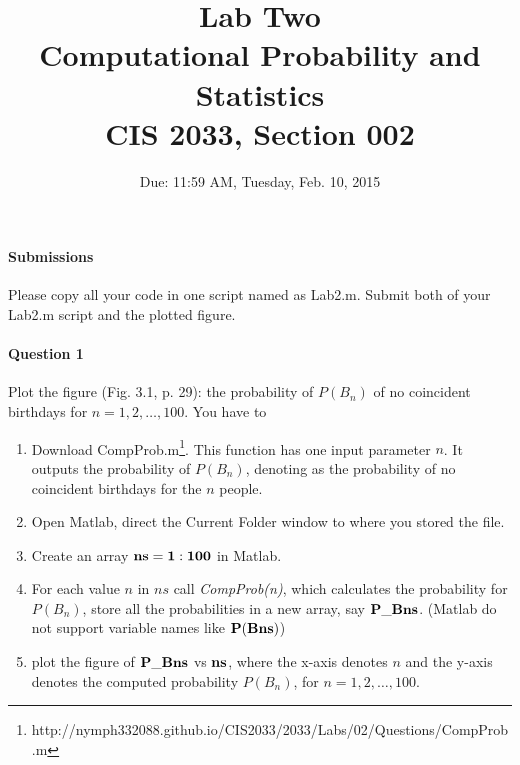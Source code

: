 \documentclass[11pt]{article} %
\title{Lab Two\\
Computational Probability and Statistics \\
CIS 2033, Section 002}
\author{Due: 11:59 AM, Tuesday, Feb. 10, 2015}
\date{} %
\begin{document}
\maketitle

\paragraph*{\bf Submissions} Please copy all your code in one script named as Lab2.m. Submit both of your Lab2.m script and the plotted figure. 

\paragraph*{Question 1}
Plot the figure (Fig. 3.1, p. 29): the probability of $P(B_n)$ of no coincident birthdays for $n=1, 2, \ldots, 100$. You have to 
\begin{enumerate}
\item Download CompProb.m\footnote{http://nymph332088.github.io/CIS2033/2033/Labs/02/Questions/CompProb.m}. This function has one input parameter $n$. It outputs the probability of $P(B_n)$, denoting as the probability of no coincident birthdays for the $n$ people.
\item Open Matlab, direct the Current Folder window to where you stored the file. 
\item Create an array $\bf ns = 1:100$ in Matlab.
\item For each value $n$ in $ns$ call {\it CompProb(n)}, which calculates the probability for $P(B_n)$, store all the probabilities in a new array, say $\bf P\_Bns$. (Matlab do not support variable names like $\bf P(Bns)$)
\item plot the figure of $\bf P\_Bns$ vs $\bf ns$, where the x-axis denotes $n$ and the y-axis denotes the computed probability $P(B_n)$, for $n = 1, 2, \ldots, 100$.
\end{enumerate}
\end{document}
